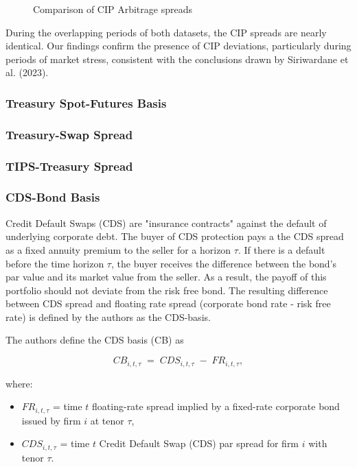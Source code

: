\documentclass{article}
\begin{document}
\begin{appendices}
\begin{figure}
  \caption{Comparison of CIP Arbitrage spreads}
  \label{fig:cip_comparison}
\end{figure}

\FloatBarrier


During the overlapping periods of both datasets, the CIP spreads are nearly identical.
Our findings confirm the presence of CIP deviations, particularly during periods of
market stress, consistent with the conclusions drawn by Siriwardane et al. (2023).


\subsubsection{Treasury Spot-Futures Basis}

\subsubsection{Treasury-Swap Spread}

\subsubsection{TIPS-Treasury Spread}

\subsubsection{CDS-Bond Basis}

Credit Default Swaps (CDS) are "insurance contracts" against the default of underlying
corporate debt. The buyer of CDS protection pays a the CDS spread as a 
fixed annuity premium to the seller for a horizon $\tau$. If there is a default
before the time horizon $\tau$, the buyer receives the difference between
the bond's par value and its market value from the seller. 
As a result, the payoff of this portfolio should not deviate from the risk free bond. 
The resulting difference between CDS spread and floating rate spread (corporate bond rate - risk free rate)
is defined by the authors as the CDS-basis.

The authors define the CDS basis (CB) as

\begin{equation}
  CB_{i,t,\tau} \;=\; CDS_{i,t,\tau} \;-\; FR_{i,t,\tau},
\end{equation}

where:
\begin{itemize}
  \item $FR_{i,t,\tau}$ = time $t$ floating-rate spread implied by a fixed-rate corporate bond issued by firm $i$ at tenor $\tau$,
  \item $CDS_{i,t,\tau}$ = time $t$ Credit Default Swap (CDS) par spread for firm $i$ with tenor $\tau$.
\end{itemize}


\end{appendices}
\end{document}
